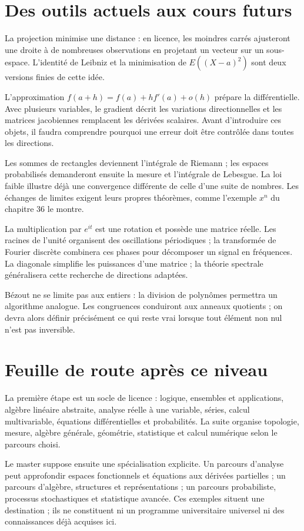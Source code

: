 \section{Des outils actuels aux cours futurs}
La projection minimise une distance : en licence, les moindres carrés ajusteront une droite à de nombreuses observations en projetant un vecteur sur un sous-espace. L'identité de Leibniz et la minimisation de $E((X-a)^2)$ sont deux versions finies de cette idée.

L'approximation $f(a+h)=f(a)+hf'(a)+o(h)$ prépare la différentielle. Avec plusieurs variables, le gradient décrit les variations directionnelles et les matrices jacobiennes remplacent les dérivées scalaires. Avant d'introduire ces objets, il faudra comprendre pourquoi une erreur doit être contrôlée dans toutes les directions.

Les sommes de rectangles deviennent l'intégrale de Riemann ; les espaces probabilisés demanderont ensuite la mesure et l'intégrale de Lebesgue. La loi faible illustre déjà une convergence différente de celle d'une suite de nombres. Les échanges de limites exigent leurs propres théorèmes, comme l'exemple $x^n$ du chapitre 36 le montre.

La multiplication par $e^{it}$ est une rotation et possède une matrice réelle. Les racines de l'unité organisent des oscillations périodiques ; la transformée de Fourier discrète combinera ces phases pour décomposer un signal en fréquences. La diagonale simplifie les puissances d'une matrice ; la théorie spectrale généralisera cette recherche de directions adaptées.

Bézout ne se limite pas aux entiers : la division de polynômes permettra un algorithme analogue. Les congruences conduiront aux anneaux quotients ; on devra alors définir précisément ce qui reste vrai lorsque tout élément non nul n'est pas inversible.
\section{Feuille de route après ce niveau}
La première étape est un socle de licence : logique, ensembles et applications, algèbre linéaire abstraite, analyse réelle à une variable, séries, calcul multivariable, équations différentielles et probabilités. La suite organise topologie, mesure, algèbre générale, géométrie, statistique et calcul numérique selon le parcours choisi.

Le master suppose ensuite une spécialisation explicite. Un parcours d'analyse peut approfondir espaces fonctionnels et équations aux dérivées partielles ; un parcours d'algèbre, structures et représentations ; un parcours probabiliste, processus stochastiques et statistique avancée. Ces exemples situent une destination ; ils ne constituent ni un programme universitaire universel ni des connaissances déjà acquises ici.

